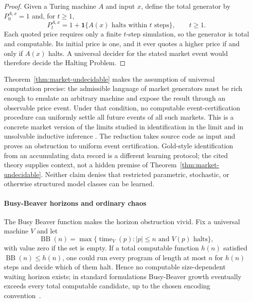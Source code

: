 \documentclass[aps,pra,reprint,superscriptaddress,amsmath,amssymb,floatfix]{revtex4-2}
\theoremstyle{plain}
\theoremstyle{definition}
\theoremstyle{remark}
\begin{document}
\begin{proof}
Given a Turing machine \(A\) and input \(x\), define the total generator by
\(P_0^{A,x}=1\) and, for \(t\geq1\),
\begin{equation}
  P_t^{A,x}
  =1+\mathbf{1}\{A(x)\text{ halts within }t\text{ steps}\},
  \qquad t\geq1 .
  \label{eq:market-halting}
\end{equation}
Each quoted price requires only a finite \(t\)-step simulation, so the
generator is total and computable. Its initial price is one, and it ever quotes
a higher price if and only if \(A(x)\) halts. A universal decider for the stated
market event would therefore decide the Halting Problem.
\end{proof}

Theorem~\ref{thm:market-undecidable} makes the assumption of universal
computation precise: the admissible language of market generators must be rich
enough to emulate an arbitrary machine and expose the result through an
observable price event. Under that condition, no computable event-certification
procedure can uniformly settle all future events of all such markets. This is
a concrete market version of the limits studied in identification in the limit
and in unsolvable inductive inference
\cite{go-67,blum75blum,angluin:83,ad-91,2016-AlexanderKarlSvozil-ml,moore}.
The reduction takes source code as input and proves an obstruction to uniform
event certification. Gold-style identification from an accumulating data
record is a different learning protocol; the cited theory supplies context,
not a hidden premise of Theorem~\ref{thm:market-undecidable}. Neither claim
denies that restricted parametric, stochastic, or otherwise structured model
classes can be learned.

\paragraph{Busy-Beaver horizons and ordinary chaos}

The Busy Beaver function makes the horizon obstruction vivid. Fix a universal
machine \(V\) and let
\begin{equation}
  \operatorname{BB}(n)
  =
  \max\{\operatorname{time}_V(p):
  |p|\leq n\text{ and }V(p)\text{ halts}\},
  \label{eq:busybeaver}
\end{equation}
with value zero if the set is empty. If a total computable function \(h(n)\)
satisfied \(\operatorname{BB}(n)\leq h(n)\), one could run every program of
length at most \(n\) for \(h(n)\) steps and decide which of them halt. Hence no
computable size-dependent waiting horizon exists; in standard formulations
Busy-Beaver growth eventually exceeds every total computable candidate, up to
the chosen encoding convention~\cite{rado,chaitin-bb}.
\end{document}

